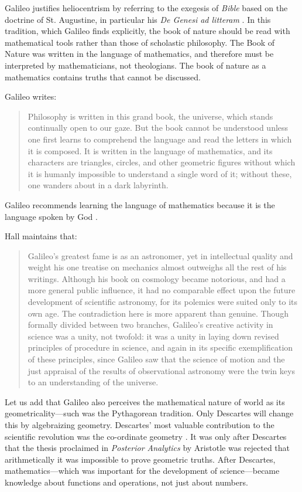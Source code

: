 \documentclass[pdftex,12pt]{article}
\begin{document}
Galileo justifies heliocentrism by referring to the exegesis of \emph {Bible} based on the doctrine of St. Augustine, in particular his \emph{De Genesi ad litteram}
\parencites{galileo_galilei_letter_1615}[cf.][p.73]{Sibley2013}. In this tradition, which Galileo finds explicitly, the book of nature should be read with mathematical tools rather than those of scholastic philosophy. The Book of Nature was written in the language of mathematics, and therefore must be interpreted by mathematicians, not theologians. The book of nature as a mathematics contains truths that cannot be discussed.

Galileo \parencite*[p.4]{Galileo1960} writes: \begin{quote} \small Philosophy is written in this grand book, the universe, which stands continually open to our gaze. But the book cannot be understood unless one first learns to comprehend the language and read the letters in which it is composed. It is written in the language of mathematics, and its characters are triangles, circles, and other geometric figures without which it is humanly impossible to understand a single word of it; without these, one wanders
about in a dark labyrinth. \end{quote} Galileo recommends learning the language of mathematics because it is the language spoken by God \parencite{Wouk2010,Strogatz2019}. 

Hall \parencite*[p.97]{Hall1956}  maintains that: \begin{quote} \small  Galileo's greatest fame is as an astronomer, yet in intellectual quality and weight his one treatise on mechanics almost outweighs all the rest of his writings. Although his book on cosmology became notorious, and had a more general public influence, it had no comparable effect upon the future development of scientific astronomy, for its polemics were suited only to its own age. The contradiction here is more apparent than genuine. Though formally divided between two branches, Galileo's creative activity in science was a unity, not twofold: it was a unity in laying down revised principles of procedure in science, and again in its specific exemplification of these principles, since Galileo saw that the science of motion and the just appraisal of the results of observational astronomy were the twin keys to an understanding of the universe. \end{quote}

Let us add that Galileo also perceives the mathematical nature of world as its geometricality---such was the Pythagorean tradition. Only Descartes will change this by algebraizing geometry.  Descartes' most valuable contribution to the scientific revolution was the co-ordinate geometry \parencite[
p.200]{Hall1956}.  It was only after Descartes that the thesis proclaimed in \emph{Posterior Analytics} by Aristotle was rejected that arithmetically it was impossible to prove geometric truths. After Descartes, mathematics---which was important for the development of science---became knowledge about functions and operations, not just about numbers.
\end{document}
